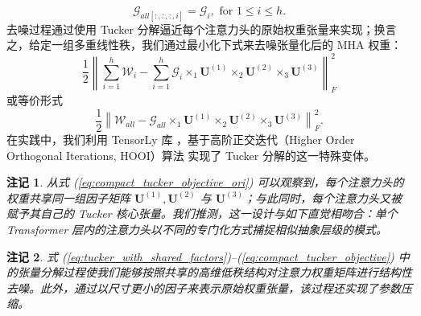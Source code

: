 \documentclass[conference]{IEEEtran}
\newtheorem{rem}{\bf{注记}}
\begin{document}
\begin{equation}
    \mathcal{G}_{all [:,:,:,i]} = \mathcal{G}_i ,\text{ for  } 1\leq i \leq h.
    \label{eq:tucker_core_all}
\end{equation}
去噪过程通过使用 Tucker 分解逼近每个注意力头的原始权重张量来实现；换言之，给定一组多重线性秩，我们通过最小化下式来去噪张量化后的 MHA 权重：
\begin{equation}
\frac{1}{2} \left\| \sum_{i=1}^h \mathcal{W}_i - \sum_{i=1}^h \mathcal{G}_i \times_1 \mathbf{U}^{(1)} \times_2 \mathbf{U}^{(2)} \times_3 \mathbf{U}^{(3)} \right\|^2_F
\label{eq:compact_tucker_objective_ori}
\end{equation}
或等价形式
\begin{equation}
\frac{1}{2} \left\|\mathcal{W}_{all} - \mathcal{G}_{all} \times_1 \mathbf{U}^{(1)} \times_2 \mathbf{U}^{(2)} \times_3 \mathbf{U}^{(3)} \right\|^2_F.
\label{eq:compact_tucker_objective}
\end{equation}
在实践中，我们利用 TensorLy 库 \cite{tensorly}，基于高阶正交迭代（Higher Order Orthogonal Iterations, HOOI）算法 \cite{de2000best} 实现了 Tucker 分解的这一特殊变体。
\begin{rem}
从式 (\ref{eq:compact_tucker_objective_ori}) 可以观察到，每个注意力头的权重共享同一组因子矩阵 $\mathbf{U}^{(1)}, \mathbf{U}^{(2)}$ 与 $\mathbf{U}^{(3)}$；与此同时，每个注意力头又被赋予其自己的 Tucker 核心张量。我们推测，这一设计与如下直觉相吻合：单个 Transformer 层内的注意力头以不同的专门化方式捕捉相似抽象层级的模式。
\end{rem} 

\begin{rem}
式 (\ref{eq:tucker_with_shared_factors})--(\ref{eq:compact_tucker_objective}) 中的张量分解过程使我们能够按照共享的高维低秩结构对注意力权重矩阵进行结构性去噪。此外，通过以尺寸更小的因子来表示原始权重张量，该过程还实现了参数压缩。
\end{rem}

\end{document}
